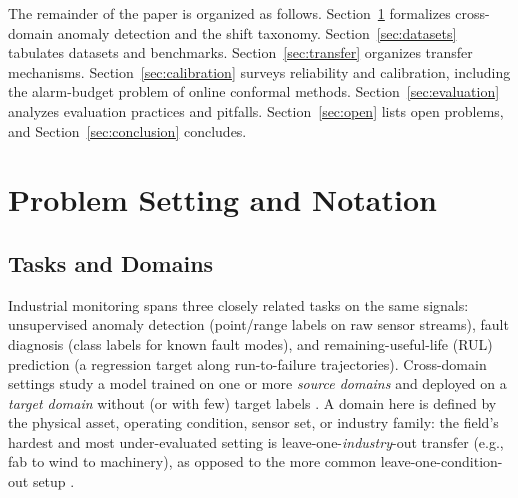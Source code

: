 The remainder of the paper is organized as follows. Section~\ref{sec:setting} formalizes cross-domain anomaly detection and the shift taxonomy. Section~\ref{sec:datasets} tabulates datasets and benchmarks. Section~\ref{sec:transfer} organizes transfer mechanisms. Section~\ref{sec:calibration} surveys reliability and calibration, including the alarm-budget problem of online conformal methods. Section~\ref{sec:evaluation} analyzes evaluation practices and pitfalls. Section~\ref{sec:open} lists open problems, and Section~\ref{sec:conclusion} concludes.

\section{Problem Setting and Notation}
\label{sec:setting}

\subsection{Tasks and Domains}
Industrial monitoring spans three closely related tasks on the same signals: unsupervised anomaly detection (point/range labels on raw sensor streams), fault diagnosis (class labels for known fault modes), and remaining-useful-life (RUL) prediction (a regression target along run-to-failure trajectories). Cross-domain settings study a model trained on one or more \emph{source domains} and deployed on a \emph{target domain} without (or with few) target labels \cite{survey2023,dacad2024}. A domain here is defined by the physical asset, operating condition, sensor set, or industry family: the field's hardest and most under-evaluated setting is leave-one-\emph{industry}-out transfer (e.g., fab to wind to machinery), as opposed to the more common leave-one-condition-out setup \cite{2503_23060,2502_00545}.

